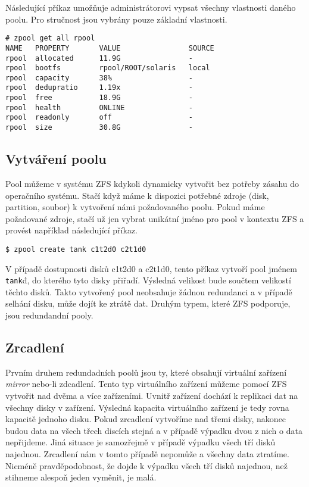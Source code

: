 Následující příkaz umožňuje administrátorovi vypsat všechny vlastnosti daného poolu. Pro stručnost jsou vybrány pouze základní vlastnosti.
\begin{verbatim}
# zpool get all rpool
NAME   PROPERTY       VALUE                SOURCE
rpool  allocated      11.9G                -
rpool  bootfs         rpool/ROOT/solaris   local
rpool  capacity       38%                  -
rpool  dedupratio     1.19x                -
rpool  free           18.9G                -
rpool  health         ONLINE               -
rpool  readonly       off                  -
rpool  size           30.8G                -
\end{verbatim}

\subsection{Vytváření poolu}
Pool můžeme v systému ZFS kdykoli dynamicky vytvořit bez potřeby zásahu do operačního systému. Stačí když máme k dispozici potřebné zdroje (disk, partition, soubor) k vytvoření námi požadovaného poolu. Pokud máme požadované zdroje, stačí už jen vybrat unikátní jméno pro pool v kontextu ZFS a provést například následující příkaz.
\begin{verbatim}
$ zpool create tank c1t2d0 c2t1d0
\end{verbatim}
V případě dostupnosti disků c1t2d0 a c2t1d0, tento příkaz vytvoří pool jménem \verb|tank|đ, do kterého tyto disky přiřadí. Výsledná velikost bude součtem velikostí těchto disků. Takto vytvořený pool neobsahuje žádnou redundanci a v případě selhání disku, může dojít ke ztrátě dat. Druhým typem, které ZFS podporuje, jsou redundandní pooly.
\subsection{Zrcadlení}
Prvním druhem redundadních poolů jsou ty, které obsahují virtuální zařízení \emph{mirror} nebo-li zdcadlení. Tento typ virtuálního zařízení můžeme pomocí ZFS vytvořit nad dvěma a více zařízeními. Uvnitř zařízení dochází k replikaci dat na všechny disky v zařízení. Výsledná kapacita virtuálního zařízení je tedy rovna kapacitě jednoho disku. Pokud zrcadlení vytvoříme nad třemi disky, nakonec budou data na všech třech discích stejná a v případě výpadku dvou z nich o data nepřijdeme. Jiná situace je samozřejmě v případě výpadku všech tří disků najednou. Zrcadlení nám v tomto případě nepomůže a všechny data ztratíme. Nicméně pravděpodobnost, že dojde k výpadku všech tří disků najednou, než stihneme alespoň jeden vyměnit, je malá.

